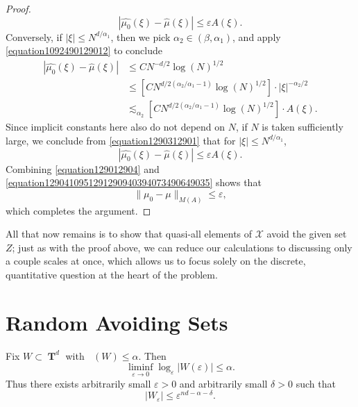 \documentclass[12pt,reqno]{article}
\DeclareMathOperator{\lowminkdim}{\underline{\dim}_{\mathbf{M}}}
\DeclareMathOperator{\TT}{\mathbf{T}}
\begin{document}
\begin{proof}
\begin{equation}
        |\widehat{\mu_0}(\xi) - \widehat{\mu}(\xi)| \leq \varepsilon A(\xi).
    \end{equation}
    Conversely, if $|\xi| \leq N^{d/\alpha_1}$, then we pick $\alpha_2 \in (\beta,\alpha_1)$, and apply \eqref{equation1092490129012} to conclude
    \begin{equation} \label{equation1290312901}
    \begin{split}
        |\widehat{\mu_0}(\xi) - \widehat{\mu}(\xi)| &\leq C N^{-d/2} \log(N)^{1/2}\\
        &\leq [C N^{d/2(\alpha_2/\alpha_1 - 1)} \log(N)^{1/2}] \cdot |\xi|^{-\alpha_2/2}\\
        &\lesssim_{\alpha_2} [C N^{d/2(\alpha_2/\alpha_1 - 1)} \log(N)^{1/2}] \cdot A(\xi).
    \end{split}
    \end{equation}
    Since implicit constants here also do not depend on $N$, if $N$ is taken sufficiently large, we conclude from \eqref{equation1290312901} that for $|\xi| \leq N^{d/\alpha_1}$,
    \begin{equation} \label{equation1290410951291290940394073490649035}
        |\widehat{\mu_0}(\xi) - \widehat{\mu}(\xi)| \leq \varepsilon A(\xi).
    \end{equation}
    Combining \eqref{equation129012904} and \eqref{equation1290410951291290940394073490649035} shows that
    \[ \| \mu_0 - \mu \|_{M(A)} \leq \varepsilon, \]
    which completes the argument.
\end{proof}

All that now remains is to show that quasi-all elements of $\mathcal{X}$ avoid the given set $Z$; just as with the proof above, we can reduce our calculations to discussing only a couple scales at once, which allows us to focus solely on the discrete, quantitative question at the heart of the problem.

\section{Random Avoiding Sets}

Fix $W \subset \TT^d$ with $\lowminkdim(W) \leq \alpha$. Then
%
\[ \liminf_{\varepsilon \to 0} \log_\varepsilon |W(\varepsilon)| \leq \alpha. \]
%
Thus there exists arbitrarily small $\varepsilon > 0$ and arbitrarily small $\delta > 0$ such that
%
\[ |W_\varepsilon| \leq \varepsilon^{nd - \alpha - \delta}. \]
\end{document}

